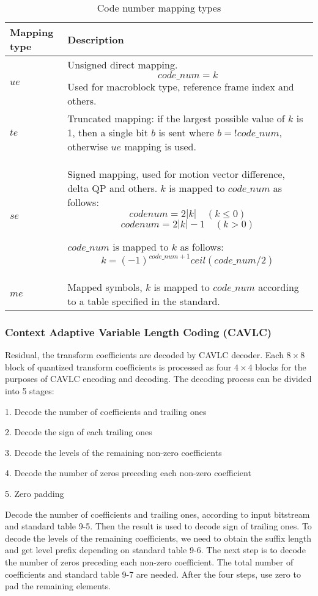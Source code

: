 \documentclass[../main.tex]{subfiles}
\begin{document}
\begin{table}[ht]
\begin{center}       
\begin{tabular}{|l|p{10cm}|} 
\hline
\rule[-1ex]{0pt}{3.5ex} Mapping type & Description \\  
\hline
\rule[-1ex]{0pt}{3.5ex} $ue$ & Unsigned direct mapping.
\[code\_num = k\]
Used for macroblock type, reference frame index and others. \\  
\hline
\rule[-1ex]{0pt}{3.5ex} $te$ & Truncated mapping: if the largest possible value of $k$ is 1, then a single bit $b$ is sent where $b = !code\_num$, otherwise $ue$ mapping is used. \\
\hline
\rule[-1ex]{0pt}{3.5ex} $se$ & Signed mapping, used for motion vector difference, delta QP and others. $k$ is mapped to $code\_num$ as follows: 
\[code num = 2|k| \quad (k \leq 0) \] 
\[code num = 2|k| - 1 \quad (k > 0) \] 

$code\_num$ is mapped to $k$ as follows:
\[k = (−1)^{code\_num + 1}ceil(code\_num / 2) \] \\
\hline
\rule[-1ex]{0pt}{3.5ex} $me$ & Mapped symbols, $k$ is mapped to $code\_num$ according to a table speciﬁed in the standard. \\
\hline
\end{tabular}
\end{center}
\caption[mapping]{\label{tab:mapping} Code number mapping types} 
\end{table}

\subsubsection{ Context Adaptive Variable Length Coding (CAVLC) }
Residual, the transform coefficients are decoded by CAVLC decoder. Each $8 \times 8$ block of quantized transform coefficients is processed as four $4 \times 4$ blocks for the purposes of CAVLC encoding and decoding. The decoding process can be divided into 5 stages:

    1. Decode the number of coefficients and trailing ones
    
    2. Decode the sign of each trailing ones
    
    3. Decode the levels of the remaining non-zero coefficients
    
    4. Decode the number of zeros preceding each non-zero coefficient
    
    5. Zero padding 

Decode the number of coefficients and trailing ones, according to input bitstream and standard table 9-5. Then the result is used to decode sign of trailing ones. To decode the levels of the remaining coefficients, we need to obtain the suffix length and get level prefix depending on standard table 9-6. The next step is to decode the number of zeros preceding each non-zero coefficient. The total number of coefficients and standard table 9-7 are needed. After the four steps, use zero to pad the remaining elements.
\end{document}
